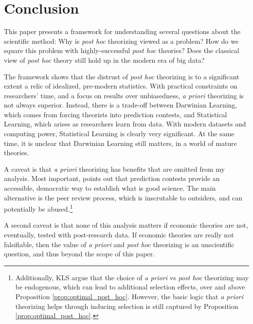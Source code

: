 \documentclass[12pt,english]{article}
\theoremstyle{plain}
\theoremstyle{plain}
\begin{document}
\section{Conclusion}

This paper presents a framework for understanding several questions about the scientific method: Why is \emph{post hoc} theorizing viewed as a problem? How do we square this problem with highly-successful \emph{post hoc} theories? Does the classical view of \emph{post hoc} theory still hold up in the modern era of big data? 

The framework shows that the distrust of \emph{post hoc} theorizing is to a significant extent a relic of idealized, pre-modern statistics. With practical constraints on researchers' time, and a focus on results over unbiasedness, \emph{a priori} theorizing is not always superior. Instead, there is a trade-off between  Darwinian Learning, which comes from forcing theorists into prediction contests, and Statistical Learning, which arises as researchers learn from data. With  modern datasets and computing power, Statistical Learning is clearly very significant. At the same time, it is unclear that Darwinian Learning still matters, in a world of mature theories.

A caveat is that \emph{a priori} theorizing has benefits that are omitted from my analysis. Most important, \citet{barnes2008paradox} points out that prediction contests provide an accessible, democratic way to establish what is good science. The main alternative is the peer review process, which is inscrutable to outsiders, and can potentially be abused.\footnote{Additionally, KLS argue that the choice of \emph{a priori} vs \emph{post hoc} theorizing may be endogenous, which can lead to additional selection effects, over and above Proposition \ref{prop:optimal_post_hoc}. However, the basic logic that \emph{a priori} theorizing helps through inducing selection is still captured by Proposition \ref{prop:optimal_post_hoc}.}

A second caveat is that none of this analysis matters if economic theories are not, eventually, tested with post-research data. If economic theories are really not falsifiable, then the value of \emph{a priori} and \emph{post hoc} theorizing is an unscientific question, and thus beyond the scope of this paper.
\end{document}
